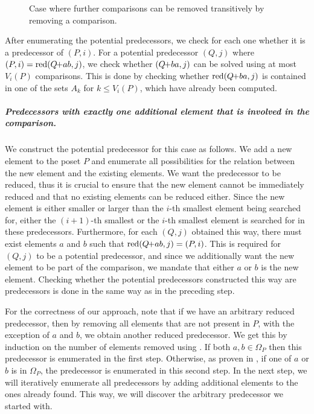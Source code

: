 \documentclass[a4paper,UKenglish,cleveref, autoref, thm-restate, anonymous]{lipics-v2021}
\newcommand{\pchild}[3]{{#1}\kern-1pt{+}{#2}{#3}}
\newcommand{\reduced}[1]{\operatorname{red}#1}
\begin{document}
\begin{figure}[!b]
  \centering
  
  \caption{Case where further comparisons can be removed transitively by removing a comparison.}
  \label{fig:backward_problematic}
\end{figure}

After enumerating the potential predecessors, we check for each one whether it is a predecessor of $(P, i)$.
For a potential predecessor $(Q, j)$ where $(P, i) = \reduced{(\pchild{Q}{a}{b}, j)}$, we check whether $(\pchild{Q}{b}{a}, j)$ can be solved using at most $V_i(P)$ comparisons.
This is done by checking whether $\reduced{(\pchild{Q}{b}{a}, j)}$ is contained in one of the sets $A_k$ for $k \leq V_i(P)$, which have already been computed.


\subparagraph{Predecessors with exactly one additional element that is involved in the comparison.}
We construct the potential predecessor for this case as follows.
We add a new element to the poset $P$ and enumerate all possibilities for the relation between the new element and the existing elements.
We want the predecessor to be reduced, thus it is crucial to ensure that the new element cannot be immediately reduced and that no existing elements can be reduced either.
Since the new element is either smaller or larger than the $i$-th smallest element being searched for, either the $(i + 1)$-th smallest or the $i$-th smallest element is searched for in these predecessors.
Furthermore, for each $(Q, j)$ obtained this way, there must exist elements $a$ and $b$ such that $\reduced{(\pchild{Q}{a}{b}, j)} = (P, i)$.
This is required for $(Q, j)$ to be a potential predecessor, and since we additionally want the new element to be part of the comparison, we mandate that either $a$ or $b$ is the new element.
Checking whether the potential predecessors constructed this way are predecessors is done in the same way as in the preceding step.

For the correctness of our approach, note that if we have an arbitrary reduced predecessor, then by removing all elements that are not present in $P$, with the exception of $a$ and $b$, we obtain another reduced predecessor.
We get this by induction on the number of elements removed using .
If both $a, b \in \Omega_P$ then this predecessor is enumerated in the first step.
Otherwise, as proven in , if one of $a$ or $b$ is in $\Omega_P$, the predecessor is enumerated in this second step.
In the next step, we will iteratively enumerate all predecessors by adding additional elements to the ones already found.
This way, we will discover the arbitrary predecessor we started with.
\end{document}
